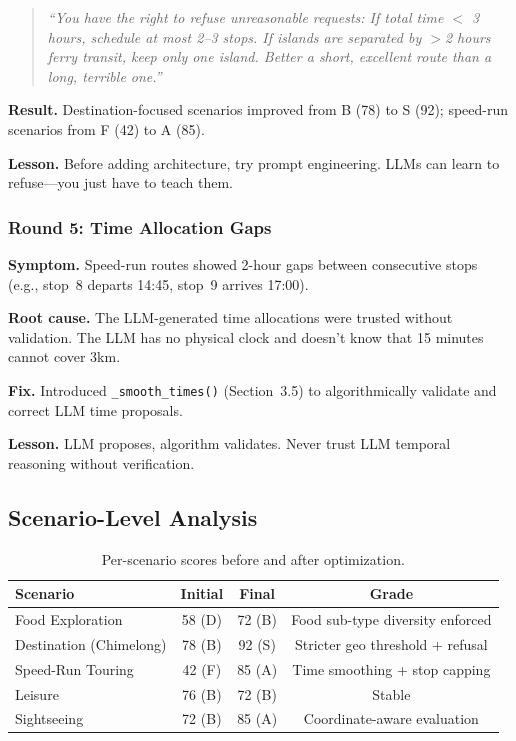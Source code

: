\documentclass[11pt]{article}
\begin{document}
\begin{quote}
\textit{``You have the right to refuse unreasonable requests: If total time $<$ 3 hours, schedule at most 2--3 stops. If islands are separated by $>$2 hours ferry transit, keep only one island. Better a short, excellent route than a long, terrible one.''}
\end{quote}

\textbf{Result.} Destination-focused scenarios improved from B (78) to S (92); speed-run scenarios from F (42) to A (85).

\textbf{Lesson.} Before adding architecture, try prompt engineering. LLMs can learn to refuse---you just have to teach them.

\subsubsection{Round 5: Time Allocation Gaps}

\textbf{Symptom.} Speed-run routes showed 2-hour gaps between consecutive stops (e.g., stop~8 departs 14:45, stop~9 arrives 17:00).

\textbf{Root cause.} The LLM-generated time allocations were trusted without validation. The LLM has no physical clock and doesn't know that 15 minutes cannot cover 3km.

\textbf{Fix.} Introduced \texttt{\_smooth\_times()} (Section~3.5) to algorithmically validate and correct LLM time proposals.

\textbf{Lesson.} LLM proposes, algorithm validates. Never trust LLM temporal reasoning without verification.

\subsection{Scenario-Level Analysis}

\begin{table}[h]
\centering
\caption{Per-scenario scores before and after optimization.}
\label{tab:scenarios}
\begin{tabular}{@{}lccc@{}}
\toprule
\textbf{Scenario} & \textbf{Initial} & \textbf{Final} & \textbf{Grade} \\
\midrule
Food Exploration & 58 (D) & 72 (B) & Food sub-type diversity enforced \\
Destination (Chimelong) & 78 (B) & 92 (S) & Stricter geo threshold + refusal \\
Speed-Run Touring & 42 (F) & 85 (A) & Time smoothing + stop capping \\
Leisure & 76 (B) & 72 (B) & Stable \\
Sightseeing & 72 (B) & 85 (A) & Coordinate-aware evaluation \\
\bottomrule
\end{tabular}
\end{table}
\end{document}
